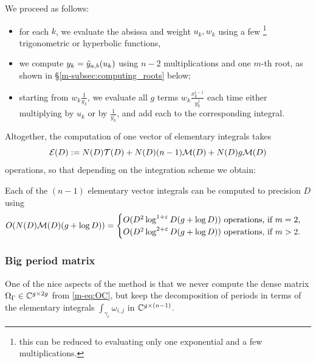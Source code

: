\documentclass[main.tex]{subfiles}
\begin{document}
   We proceed as follows:
   \begin{itemize}
   \item for each $k$, we evaluate the absissa and weight $u_k,w_k$ using
       a few \footnote{this can be reduced to evaluating only one exponential
       and a few multiplications.} trigonometric or hyperbolic functions,
   \item we compute $y_k=\tilde{y}_{a,b}(u_k)$ using $n-2$ multiplications and one $m$-th root,
       as shown in \S \ref{m-subsec:computing_roots} below;
   \item starting from $w_k\frac{1}{y_k}$, we evaluate all $g$ terms $w_k\frac{x_k^{i-1}}{y_k^j}$
       each time either multiplying by $u_k$ or by $\frac{1}{y_k}$, and add each to the corresponding
       integral.
   \end{itemize}

   Altogether, the computation of one vector of elementary integrals takes
   \begin{equation}\label{eq:elem_int_complexity}
    \mathcal E(D) := N(D)\mathcal T(D)+N(D)(n-1)\mathcal M(D)+N(D)g\mathcal M(D)
   \end{equation}
    operations,
   so that depending on the integration scheme we obtain:
   \begin{thm}\label{thm:complexity_integrals}
       Each of the $(n-1)$ elementary vector integrals can be computed to precision $D$ using
       \begin{equation}
           O(N(D)\mathcal M(D)(g+\log D)) =
           \begin{cases}
               O(D^2\log^{1+\varepsilon} D (g + \log D)) \text{ operations, if $m=2$,}\\
               O(D^2\log^{2+\varepsilon} D (g + \log D)) \text{ operations, if $m>2$.}
           \end{cases}
       \end{equation}
   \end{thm}

   \subsubsection{Big period matrix}

   One of the nice aspects of the method is that we never compute
   the dense matrix $\Omega_{\Gamma}\in\mathbb{C}^{g\times 2g}$ from \eqref{m-eq:OC}, but
   keep the decomposition of periods in terms of the elementary integrals
   $\int_{\gamma_e}\omega_{i,j}$ in $\mathbb{C}^{g\times (n-1)}$.
\end{document}
